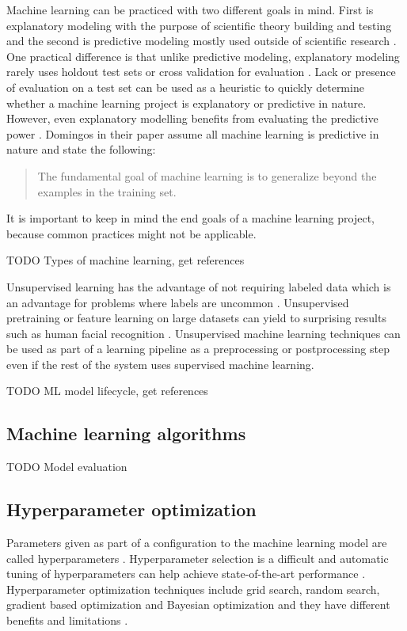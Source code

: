 Machine learning can be practiced with two different goals in mind. First is explanatory modeling with the purpose of scientific theory building and testing and the second is predictive modeling mostly used outside of scientific research \parencite{shmueliExplainPredict2010a}. One practical difference is that unlike predictive modeling, explanatory modeling rarely uses holdout test sets or cross validation for evaluation \parencite{shmueliExplainPredict2010a}. Lack or presence of evaluation on a test set can be used as a heuristic to quickly determine whether a machine learning project is explanatory or predictive in nature. However, even explanatory modelling benefits from evaluating the predictive power \parencite{shmueliExplainPredict2010a}. Domingos \parencite*{domingosFewUsefulThings2012} in their paper assume all machine learning is predictive in nature and state the following: \begin{quote}
    The fundamental goal of machine learning is to generalize beyond the examples in the training set.
\end{quote}
It is important to keep in mind the end goals of a machine learning project, because common practices might not be applicable.

TODO Types of machine learning, get references

Unsupervised learning has the advantage of not requiring labeled data which is an advantage for problems where labels are uncommon \parencite{leBuildingHighlevelFeatures2012}. Unsupervised pretraining or feature learning on large datasets can yield to surprising results such as human facial recognition \parencite{leBuildingHighlevelFeatures2012}. Unsupervised machine learning techniques can be used as part of a learning pipeline as a preprocessing or postprocessing step even if the rest of the system uses supervised machine learning.

TODO ML model lifecycle, get references

\subsection{Machine learning algorithms}

TODO Model evaluation


\subsection{Hyperparameter optimization}

Parameters given as part of a configuration to the machine learning model are called hyperparameters \parencite{yangHyperparameterOptimizationMachine2020}. Hyperparameter selection is a difficult and automatic tuning of hyperparameters can help achieve state-of-the-art performance \parencite{maclaurinGradientbasedHyperparameterOptimization2015}. Hyperparameter optimization techniques include grid search, random search, gradient based optimization and Bayesian optimization and they have different benefits and limitations \parencite{yangHyperparameterOptimizationMachine2020}.

